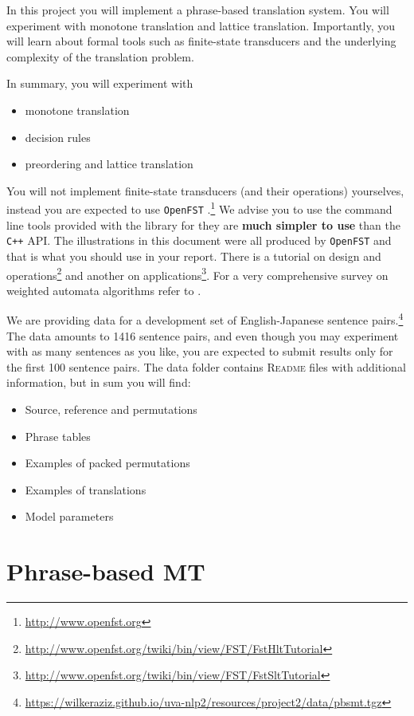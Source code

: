 
In this project you will implement a phrase-based translation system.
You will experiment with monotone translation and lattice translation.
Importantly, you will learn about formal tools such as finite-state transducers and the underlying complexity of the translation problem.

In summary, you will experiment with

\begin{itemize}
	\item monotone translation
	\item decision rules
	\item preordering and lattice translation
\end{itemize}

You will not implement finite-state transducers (and their operations) yourselves, instead you are expected to use \texttt{OpenFST} \citep{Allauzen+2007:OpenFST}.\footnote{\url{http://www.openfst.org}}
We advise you to use the command line tools provided with the library for they are {\bf much simpler to use} than the \texttt{C++} API.
The illustrations in this document were all produced by \texttt{OpenFST} and that is what you should use in your report.
There is a tutorial on design and operations\footnote{\url{http://www.openfst.org/twiki/bin/view/FST/FstHltTutorial}} and another on applications\footnote{\url{http://www.openfst.org/twiki/bin/view/FST/FstSltTutorial}}.
For a very comprehensive survey on weighted automata algorithms refer to \citep{Mohri:2009:WAA}. 

We are providing data for a development set of English-Japanese sentence pairs.\footnote{\url{https://wilkeraziz.github.io/uva-nlp2/resources/project2/data/pbsmt.tgz}} The data amounts to 1416 sentence pairs, and even though you may experiment with as many sentences as you like, you are expected to submit results only for the first 100 sentence pairs. 
The data folder contains \textsc{Readme} files with additional information, but in sum you will find:
\begin{itemize}
	\item Source, reference and permutations
	\item Phrase tables
	\item Examples of packed permutations
	\item Examples of translations
	\item Model parameters
\end{itemize}



\section{Phrase-based MT}


